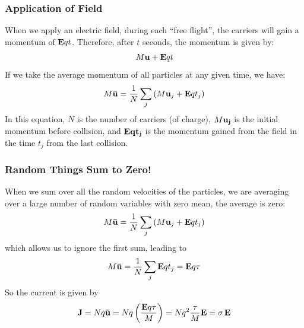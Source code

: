 \subsubsection{Application of Field}
When we apply an electric field, during each “free flight”, the carriers will gain a momentum of $ {\bf{E}}qt $.  Therefore, after $t$ seconds, the momentum is given by:
    \begin{equation}
        M{\bf{u}} + {\bf{E}}qt
    \end{equation}
If we take the average momentum of all particles at any given time, we have:
    \begin{equation}
        M{\bf{\bar u}} = \frac{1}{N}\sum\limits_j {\left( {M{{\bf{u}}_j} + {\bf{E}}q{t_j}} \right)}
    \end{equation}
In this equation, $ N $ is the number of carriers (of charge), $ M \bf{u}_j $ is the initial momentum before collision, and $\bf{E}q{t_j}$ is the momentum gained from the field in the time $t_j$ from the last collision.
\subsubsection{Random Things Sum to Zero!}
When we sum over all the random velocities of the particles, we are averaging over a large number of random variables with zero mean, the average is zero:
    \begin{equation}
        M{\bf{\bar u}} = \frac{1}{N}\sum\limits_j {\left( {M{{\bf{u}}_j} + {\bf{E}}q{t_j}} \right)}
    \end{equation}
which allows us to ignore the first sum, leading to
    \begin{equation}
        M{\bf{\bar u}} = \frac{1}{N}\sum\limits_j {{\bf{E}}q{t_j}}  = {\bf{E}}q\tau
    \end{equation}
So the current is given by
    \begin{equation}
        {\bf{J}} = Nq{\bf{\bar u}} = Nq\left( {\frac{{{\bf{E}}q\tau }}{M}} \right) = N{q^2}\frac{\tau }{M}{\bf{E}} = \sigma \,{\bf{E}}
    \end{equation}
